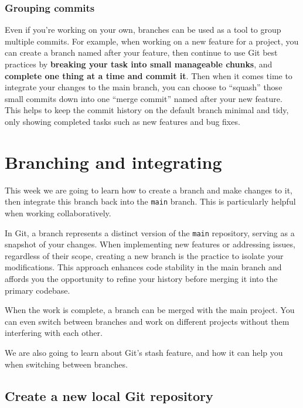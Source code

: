 \documentclass[
  letterpaper,
  DIV=11,
  numbers=noendperiod]{scrartcl}
\begin{document}
\hypertarget{grouping-commits}{%
\subsubsection{Grouping commits}\label{grouping-commits}}

Even if you're working on your own, branches can be used as a tool to
group multiple commits. For example, when working on a new feature for a
project, you can create a branch named after your feature, then continue
to use Git best practices by \textbf{breaking your task into small
manageable chunks}, and \textbf{complete one thing at a time and commit
it}. Then when it comes time to integrate your changes to the main
branch, you can choose to ``squash'' those small commits down into one
``merge commit'' named after your new feature. This helps to keep the
commit history on the default branch minimal and tidy, only showing
completed tasks such as new features and bug fixes.

\hypertarget{branching-and-integrating}{%
\section{Branching and integrating}\label{branching-and-integrating}}

This week we are going to learn how to create a branch and make changes
to it, then integrate this branch back into the \texttt{main} branch.
This is particularly helpful when working collaboratively.

In Git, a branch represents a distinct version of the \texttt{main}
repository, serving as a snapshot of your changes. When implementing new
features or addressing issues, regardless of their scope, creating a new
branch is the practice to isolate your modifications. This approach
enhances code stability in the main branch and affords you the
opportunity to refine your history before merging it into the primary
codebase.

When the work is complete, a branch can be merged with the main project.
You can even switch between branches and work on different projects
without them interfering with each other.

We are also going to learn about Git's stash feature, and how it can
help you when switching between branches.

\hypertarget{create-a-new-local-git-repository}{%
\subsection{Create a new local Git
repository}\label{create-a-new-local-git-repository}}
\end{document}
